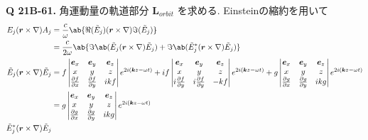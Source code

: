 \documentclass[uplatex,dvipdfmx,a4paper,11pt]{jlreq}
\newcommand{\rr}{\bm{r}}
\newcommand{\kk}{\bm{k}}
\newcommand{\Et}{\tilde{E}}
\newcommand{\LL}{\bm{L}}
\newcommand{\vnabla}{\mathbf{\nabla}}
\newcommand\vmqty[1]{\begin{vmatrix}#1\end{vmatrix}}
\theoremstyle{definition}
\begin{document}
\textbf{Q 21B-61.}
角運動量の軌道部分 $\LL_{orbit}$ を求める. Einsteinの縮約を用いて
\begin{align}
  E_j(\rr\times\vnabla)A_j
                     & = \frac{c}{\omega}\ab\{\Re(\Et_j)(\rr\times\vnabla)\Im(\Et_j)\}                                                                                                                                                                                                                                        \\
                     & = \frac{c}{2\omega}\ab\{\Im\ab(\Et_j(\rr\times\vnabla)\Et_j) + \Im\ab(\Et_j^*(\rr\times\vnabla)\Et_j)\}                                                                                                                                                                                                \\
  \Et_j(\rr\times\vnabla)\Et_j
                     & = f\vmqty{\bm{e}_x                                                                                                                                                                                                                                                               & \bm{e}_y & \bm{e}_z \\ x & y & z \\ \diffp{f}{x} & \diffp{f}{y} & i kf } e^{2i(\kk z-\omega t)} + i f\vmqty{\bm{e}_x                                                                                        & \bm{e}_y & \bm{e}_z \\ x & y & z \\ i\diffp{f}{y} & i\diffp{f}{y} & -kf } e^{2i(\kk z-\omega t)} + g\vmqty{\bm{e}_x                                                                                        & \bm{e}_y & \bm{e}_z \\ x & y & z \\ \diffp{g}{x} & \diffp{g}{y} & i kg } e^{2i(\kk z-\omega t)} \\
                     & = g\vmqty{\bm{e}_x                                                                                                                                                                                                                                                               & \bm{e}_y & \bm{e}_z \\ x & y & z \\ \diffp{g}{x} & \diffp{g}{y} & i kg } e^{2i(\kk z-\omega t)} \\
  \Et_j^*(\rr\times\vnabla)\Et_j

\end{align}
\end{document}

